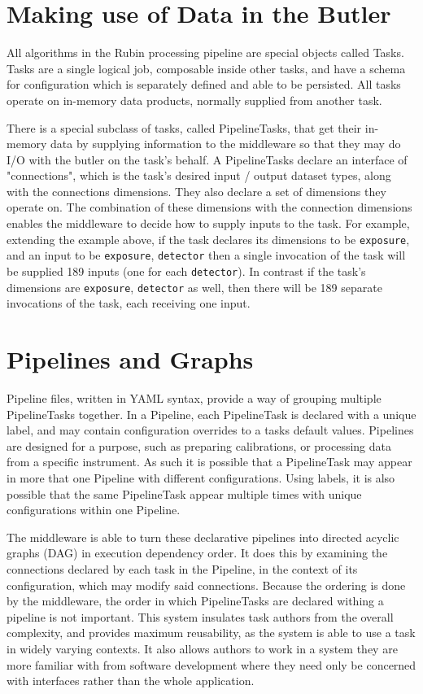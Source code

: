 \section{Making use of Data in the Butler}
All algorithms in the Rubin processing pipeline are special objects called Tasks. Tasks are a single logical job, composable inside other tasks, and have a schema for configuration which is separately defined and able to be persisted. All tasks operate on in-memory data products, normally supplied from another task.

There is a special subclass of tasks, called PipelineTasks, that get their in-memory data by supplying information to the middleware so that they may do I/O with the butler on the task's behalf. A PipelineTasks declare an interface of "connections", which is the task's desired input / output dataset types, along with the connections dimensions. They also declare a set of dimensions they operate on. The combination of these dimensions with the connection dimensions enables the middleware to decide how to supply inputs to the task. For example, extending the example above, if the task declares its dimensions to be \texttt{exposure}, and an input to be \texttt{exposure}, \texttt{detector} then a single invocation of the task will be supplied 189 inputs (one for each \texttt{detector}). In contrast if the task's dimensions are \texttt{exposure}, \texttt{detector} as well, then there will be 189 separate invocations of the task, each receiving one input.

\section{Pipelines and Graphs}
Pipeline files, written in YAML syntax, provide a way of grouping multiple PipelineTasks together. In a Pipeline, each PipelineTask is declared with a unique label, and may contain configuration overrides to a tasks default values. Pipelines are designed for a purpose, such as preparing calibrations, or processing data from a specific instrument. As such it is possible that a PipelineTask may appear in more that one Pipeline with different configurations. Using labels, it is also possible that the same PipelineTask appear multiple times with unique configurations within one Pipeline.

The middleware is able to turn these declarative pipelines into directed acyclic graphs (DAG) in execution dependency order. It does this by examining the connections declared by each task in the Pipeline, in the context of its configuration, which may modify said connections. Because the ordering is done by the middleware, the order in which PipelineTasks are declared withing a pipeline is not important. This system insulates task authors from the overall complexity, and provides maximum reusability, as the system is able to use a task in widely varying contexts. It also allows authors to work in a system they are more familiar with from software development where they need only be concerned with interfaces rather than the whole application.

